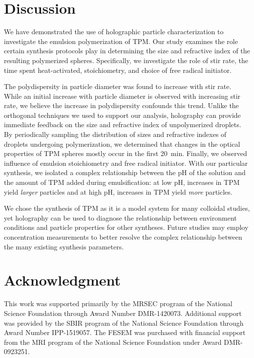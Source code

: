 \section{Discussion}

We have demonstrated the use of holographic particle characterization
to investigate the emulsion polymerization of TPM. Our study examines the
role certain synthesis protocols play in determining the
size and refractive index of the resulting polymerized spheres. Specifically,
we investigate the role of stir rate, the time spent heat-activated, stoichiometry, and choice of
free radical initiator.

The polydispersity in particle diameter was found to increase
with stir rate. While an initial increase with particle diameter is observed with increasing
stir rate, we believe the increase in polydispersity confounds this trend.
Unlike the orthogonal techniques we used to support our analysis,
holography can provide immediate feedback on the size and refractive index of unpolymerized
droplets. By periodically sampling the distribution of sizes and refractive indexes of
droplets undergoing polymerization, we determined that changes in the optical properties
of TPM spheres mostly occur in the first \SI{20}{\minute}. Finally, we observed
influence of emulsion stoichiometry and free radical initiator.
With our particular synthesis, we isolated a complex
relationship between the pH of the solution and the amount of TPM added
during emulsification: at low pH, increases in TPM yield \emph{larger}
particles and at high pH, increases in TPM yield \emph{more} particles.

We chose the synthesis of TPM as it is a model system for many colloidal studies, yet holography
can be used to diagnose the relationship between environment conditions and
particle properties for other syntheses. Future studies may employ concentration
measurements to better resolve the complex relationship between the many existing
synthesis parameters.

\section{Acknowledgment}

This work was supported primarily by the MRSEC program of
the National Science Foundation through Award Number DMR-1420073.
Additional support was provided by the SBIR program of the
National Science Foundation through Award Number IPP-1519057.
The FESEM was purchased with financial support from the MRI program
of the National Science Foundation under Award DMR-0923251.
